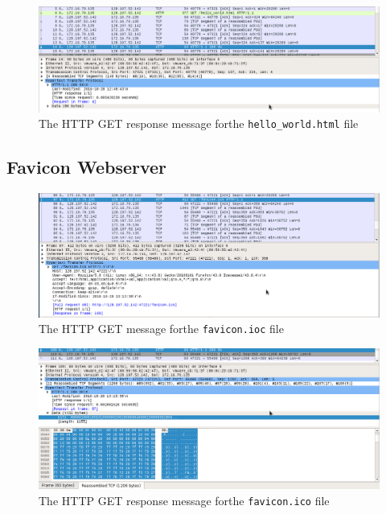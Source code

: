 \documentclass[12pt]{article}
\begin{document}
	\begin{figure}[h]
		\caption{The HTTP GET response message forthe \texttt{hello\_world.html} file}
		\centering
		\includegraphics[width=\textwidth,height=\textheight,keepaspectratio,scale=0.5=0.5]{200_resp}
	\end{figure}
\clearpage
\subsection{Favicon Webserver}

	\begin{figure}[h]
		\caption{The HTTP GET message forthe \texttt{favicon.ioc} file}
		\centering
		\includegraphics[width=\textwidth,height=\textheight,keepaspectratio,scale=0.5=0.5]{get_fav}
	\end{figure}

	\begin{figure}[h]
		\caption{The HTTP GET response message forthe \texttt{favicon.ico} file}
		\centering
		\includegraphics[width=\textwidth,height=\textheight,keepaspectratio,scale=0.5=0.5]{fav_resp}
	\end{figure}
\clearpage
\end{document}
